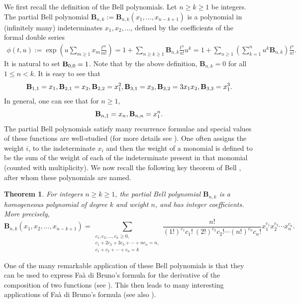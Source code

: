 \documentclass[12pt]{amsart}
\newtheorem{thm}{Theorem}
\begin{document}
We first recall the definition of the Bell polynomials. Let $n\geq k\geq 1$ be integers. The partial Bell polynomial   $\mathbf{B}_{n,k}:=\mathbf{B}_{n,k}(x_1,\ldots,x_{n-k+1})$ is a polynomial in (infinitely many) indeterminates  $x_1, x_2,\ldots$, defined by the coefficients of the formal double series
\begin{align*}
\phi(t,u):=\exp\left(u\sum_{m\geq1}x_m\frac{t^m}{m!}\right)=1+\sum_{n\geq k\geq 1}\mathbf{B}_{n,k}\frac{t^n}{n!}u^k
=1+\sum_{n\geq 1}\left(\sum_{k=1}^{n}u^k\mathbf{B}_{n,k}\right)\frac{t^n}{n!}.
\end{align*}
It is natural to set ${\bf B}_{0,0}=1$. Note that by the above definition, $\mathbf{B}_{n,k}=0$ for all $1\leq n<k$.  It is easy to see that
$$
{\bf B}_{1,1}=x_1, {\bf B}_{2,1}=x_2, {\bf B}_{2,2}=x_1^2, {\bf B}_{3,1}=x_3, {\bf B}_{3,2}=3x_1x_2, {\bf B}_{3,3}=x_1^3.
$$
In general, one can see that for $n \ge 1$,
$$
{\bf B}_{n,1}=x_n, {\bf B}_{n,n}=x_1^{n}.
$$
The partial Bell polynomials satisfy many recurrence formulae and special values of these functions are well-studied (for more details see \cite{L}).
One often assigns the weight $i$, to the indeterminate $x_i$ and then the weight of a monomial is defined to be the sum of the weight of each of the indeterminate present in that monomial (counted with multiplicity). We now recall the following key theorem of Bell \cite{B}, after whom these polynomials are named. 

\begin{thm}\label{them-Bell}
For integers $n\geq k\geq 1$, the partial Bell polynomial $\mathbf{B}_{n,k}$ is a homogeneous polynomial of degree $k$ and  weight $n$, and has integer coefficients. More precisely,
$$
\mathbf{B}_{n,k}(x_1, x_2, \ldots, x_{n-k+1})=\sum_{ \substack{c_1,c_2, \ldots,c_n \geq 0, \\c_1+2c_2+3c_3+\cdots+nc_n=n,\\ c_1+c_2+\cdots+c_n=k}}\frac{n!}{(1!)^{c_1}c_1!\  (2!)^{c_2}c_2!\cdots (n!)^{c_n}c_n!}x_1^{c_1}x_2^{c_2}\cdots x_n^{c_n}.
$$
\end{thm}

One of the many remarkable application of these Bell polynomials is that they can be used to express Fa\`{a} di Bruno's formula for the derivative of the composition of two functions (see \cite{WJ}). This then leads to many interesting applications of Fa\`{a} di Bruno's formula (see also \cite{TM}).
\end{document}
